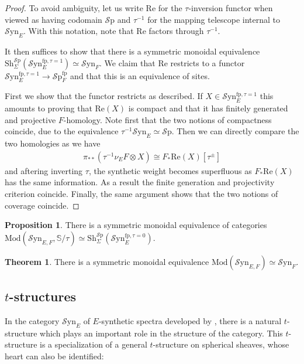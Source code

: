 \documentclass[10pt]{amsart}
\theoremstyle{definition}
\numberwithin{figure}{section}
\numberwithin{equation}{section}
\newtheorem{theorem}[figure]{Theorem}
\newtheorem{proposition}[figure]{Proposition}
\theoremstyle{cited}
\newcommand{\bS}{\mathbb{S}}
\newcommand{\Sp}{{\mathcal{S}\mathrm{p}}}
\newcommand{\Mod}{\mathrm{Mod}}
\newcommand{\Sh}{\mathrm{Sh}}
\newcommand{\fp}{\mathrm{fp}}
\newcommand{\Syn}{\mathcal{S}\mathrm{yn}}
\renewcommand{\Re}{\mathrm{Re}}
\begin{document}
\begin{proof}
  To avoid ambiguity, let us write $\Re$ for the $\tau$-inversion functor when viewed as having codomain $\Sp$ and $\tau^{-1}$ for the mapping telescope internal to $\Syn_E$. With this notation, note that $\Re$ factors through $\tau^{-1}$.
  
  
  It then suffices to show that there is a symmetric monoidal equivalence $\Sh_{\Sigma}^\Sp(\Syn_E^{\fp, \tau=1})\simeq \Syn_F$. We claim that $\Re$ restricts to a functor $\Syn_E^{\fp, \tau=1}\to \Sp^\fp_F$ and that this is an equivalence of sites. 

  First we show that the functor restricts as described. If $X\in \Syn_E^{\fp, \tau=1}$ this amounts to proving that $\Re(X)$ is compact and that it has finitely generated and projective $F$-homology. Note first that the two notions of compactness coincide, due to the equivalence $\tau^{-1}\Syn_E\simeq \Sp$. Then we can directly compare the two homologies as we have
  \begin{align*}
    \pi_{**}(\tau^{-1}\nu_E F\otimes X)\cong F_*\Re(X)[\tau^{\pm}]
  \end{align*}
  and aftering inverting $\tau$, the synthetic weight becomes superfluous as $F_*\Re(X)$ has the same information. As a result the finite generation and projectivity criterion coincide. Finally, the same argument shows that the two notions of coverage coincide.
\end{proof}

\begin{proposition}
  There is a symmetric monoidal equivalence  of categories $\Mod(\Syn_{E,F}, \bS/\tau)\simeq \Sh_{\Sigma}^\Sp(\Syn_E^{\fp, \tau=0})$.
\end{proposition}

\begin{theorem}
  There is a symmetric monoidal equivalence $\Mod(\Syn_{E,F})\simeq \Syn_F$.
\end{theorem}


\subsection{$t$-structures}

In the category $\Syn_E$ of $E$-synthetic spectra developed by \cite{Pst22}, there is a natural $t$-structure which plays an important role in the structure of the category. This $t$-structure is a specialization of a general $t$-structure on spherical sheaves, whose heart can also be identified:
\end{document}
